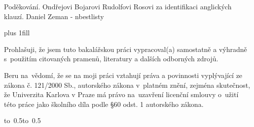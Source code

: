 \documentclass[12pt,a4paper]{report}
\let\openright=\clearpage
\begin{document}
\newpage



\openright

\noindent
Poděkování.
Ondřejovi Bojarovi
Rudolfovi Rosovi za identifikaci anglických klauzí.
Daniel Zeman - nbestlisty

\newpage


\vglue 0pt plus 1fill

\noindent
Prohlašuji, že jsem tuto bakalářskou práci vypracoval(a) samostatně a výhradně
s~použitím citovaných pramenů, literatury a dalších odborných zdrojů.

\medskip\noindent
Beru na~vědomí, že se na moji práci vztahují práva a povinnosti vyplývající
ze zákona č. 121/2000 Sb., autorského zákona v~platném znění, zejména skutečnost,
že Univerzita Karlova v Praze má právo na~uzavření licenční smlouvy o~užití této
práce jako školního díla podle §60 odst. 1 autorského zákona.

\vspace{10mm}

\hbox{\hbox to 0.5\hbox to 0.5}

\vspace{20mm}
\newpage

\end{document}
